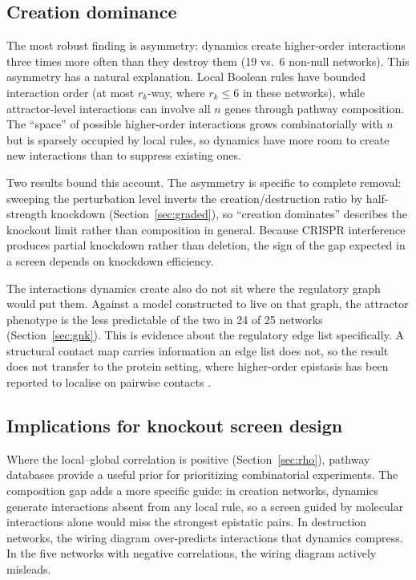 \documentclass[10pt]{article}
\begin{document}
\subsection{Creation dominance}

The most robust finding is asymmetry: dynamics create higher-order
interactions three times more often than they destroy them (19 vs.\ 6
non-null networks). This asymmetry has a natural explanation. Local
Boolean rules have bounded interaction order (at most $r_k$-way,
where $r_k \leq 6$ in these networks), while attractor-level
interactions can involve all $n$ genes through pathway composition.
The ``space'' of possible higher-order interactions grows
combinatorially with $n$ but is sparsely occupied by local rules,
so dynamics have more room to create new interactions than to
suppress existing ones.

Two results bound this account. The asymmetry is specific to complete
removal: sweeping the perturbation level inverts the creation/destruction
ratio by half-strength knockdown (Section~\ref{sec:graded}), so
``creation dominates'' describes the knockout limit rather than
composition in general. Because CRISPR interference produces partial
knockdown rather than deletion, the sign of the gap expected in a screen
depends on knockdown efficiency.

The interactions dynamics create also do not sit where the regulatory
graph would put them. Against a model constructed to live on that graph,
the attractor phenotype is the less predictable of the two in 24 of 25
networks (Section~\ref{sec:gnk}). This is evidence about the regulatory
edge list specifically. A structural contact map carries information an
edge list does not, so the result does not transfer to the protein
setting, where higher-order epistasis has been reported to localise on
pairwise contacts \citep{brookes2022sparsity}.

\subsection{Implications for knockout screen design}

Where the local--global correlation is positive
(Section~\ref{sec:rho}), pathway databases provide a useful prior
for prioritizing combinatorial experiments. The composition gap
adds a more specific guide: in creation networks, dynamics generate
interactions absent from any local rule, so a screen guided by
molecular interactions alone would miss the strongest epistatic
pairs. In destruction networks, the wiring diagram over-predicts
interactions that dynamics compress. In the five networks with
negative correlations, the wiring diagram actively misleads.
\end{document}

